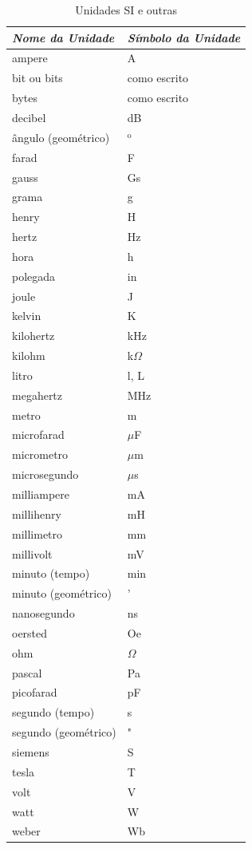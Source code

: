 \documentclass
  [ams,pdfout]%
	{aesbr}
\begin{document}
\begin{table}[!ht]
\caption{Unidades SI e outras}
\label{tab:units}
\vspace*{10pt}
\centering
\small
\begin{tabular}{ll}
\textit{Nome da Unidade}      	&	\textit{Símbolo da Unidade}\\ \hline
ampere             		&	A\\
bit ou bits        		&	como escrito\\
bytes              		&	como escrito\\
decibel           		&	dB\\
ângulo (geométrico)     	&	$^\textrm{o}$\\
farad             		&	F\\
gauss             		&	Gs\\
grama              		&	g\\
henry              		&	H\\
hertz              		&	Hz\\
hora              		&	h\\
polegada             		&	in\\
joule              		&	J\\
kelvin             		&	K\\
kilohertz          		&	kHz\\
kilohm                		&	k$\Omega$\\
litro             		&	l, L\\
megahertz         		&	MHz\\
metro              		&	m\\
microfarad         		&	$\mu$F\\
micrometro         		&	$\mu$m\\
microsegundo        		&	$\mu$s\\
milliampere        		&	mA\\
millihenry         		&	mH\\
millimetro         		&	mm\\
millivolt          		&	mV\\
minuto (tempo)        		&	min\\
minuto (geométrico)     	&      	'\\
nanosegundo         		&	ns\\
oersted           		&	Oe\\
ohm                		&	$\Omega$\\
pascal             		&	Pa\\
picofarad          		&	pF\\
segundo (tempo)      		&	s\\
segundo (geométrico)    	&	"\\
siemens            		&	S\\
tesla              		&	T\\
volt               		&	V\\
watt               		&	W\\
weber              		&	Wb\\
\end{tabular} 
\end{table}
%
\end{document}
